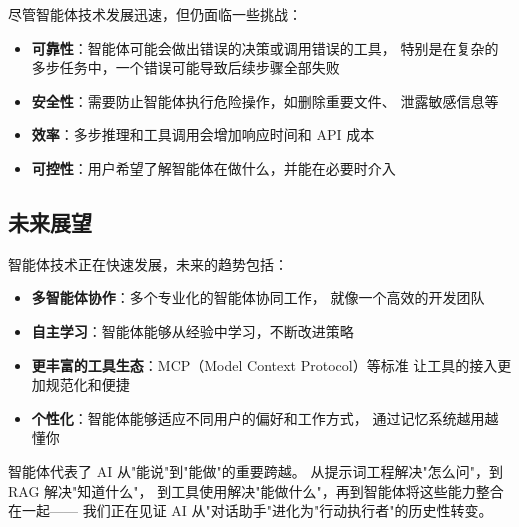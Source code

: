 尽管智能体技术发展迅速，但仍面临一些挑战：

\begin{itemize}
    \item \textbf{可靠性}：智能体可能会做出错误的决策或调用错误的工具，
        特别是在复杂的多步任务中，一个错误可能导致后续步骤全部失败
    \item \textbf{安全性}：需要防止智能体执行危险操作，如删除重要文件、
        泄露敏感信息等
    \item \textbf{效率}：多步推理和工具调用会增加响应时间和 API 成本
    \item \textbf{可控性}：用户希望了解智能体在做什么，并能在必要时介入
\end{itemize}

\subsection{未来展望}

智能体技术正在快速发展，未来的趋势包括：

\begin{itemize}
    \item \textbf{多智能体协作}：多个专业化的智能体协同工作，
        就像一个高效的开发团队
    \item \textbf{自主学习}：智能体能够从经验中学习，不断改进策略
    \item \textbf{更丰富的工具生态}：MCP（Model Context Protocol）等标准
        让工具的接入更加规范化和便捷
    \item \textbf{个性化}：智能体能够适应不同用户的偏好和工作方式，
        通过记忆系统越用越懂你
\end{itemize}

智能体代表了 AI 从"能说"到"能做"的重要跨越。
从提示词工程解决"怎么问"，到 RAG 解决"知道什么"，
到工具使用解决"能做什么"，再到智能体将这些能力整合在一起——
我们正在见证 AI 从"对话助手"进化为"行动执行者"的历史性转变。
